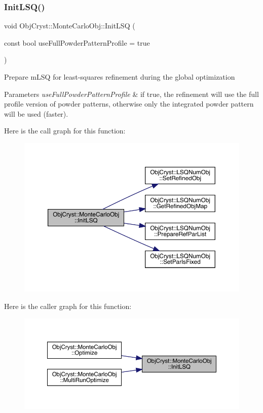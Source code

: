 \subsubsection{\texorpdfstring{InitLSQ()}{InitLSQ()}}
{\footnotesize\ttfamily void Obj\+Cryst\+::\+Monte\+Carlo\+Obj\+::\+Init\+L\+SQ (\begin{DoxyParamCaption}\item[{const bool}]{use\+Full\+Powder\+Pattern\+Profile = {\ttfamily true} }\end{DoxyParamCaption})\hspace{0.3cm}{\ttfamily [virtual]}}

Prepare m\+L\+SQ for least-\/squares refinement during the global optimization


\begin{DoxyParams}{Parameters}
{\em use\+Full\+Powder\+Pattern\+Profile} & if true, the refinement will use the full profile version of powder patterns, otherwise only the integrated powder pattern will be used (faster). \\
\hline
\end{DoxyParams}
Here is the call graph for this function\+:
\nopagebreak
\begin{figure}[H]
\begin{center}
\leavevmode
\includegraphics[width=350pt]{class_obj_cryst_1_1_monte_carlo_obj_acd2853f973a5b26b5fac47e3152aec4b_cgraph}
\end{center}
\end{figure}
Here is the caller graph for this function\+:
\nopagebreak
\begin{figure}[H]
\begin{center}
\leavevmode
\includegraphics[width=350pt]{class_obj_cryst_1_1_monte_carlo_obj_acd2853f973a5b26b5fac47e3152aec4b_icgraph}
\end{center}
\end{figure}
